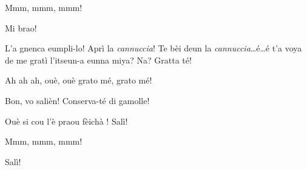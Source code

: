 \begin{drama}
\PersEmpourtantaspeaks Mmm, mmm, mmm! 

\Gerominespeaks Mi brao!

\Casimirspeaks L'a gnenca eumpli-lo! Aprì la \textit{cannuccia}! Te bèi deun la \textit{cannuccia}\ldots é\ldots é t'a voya de me gratì l'itseun-a eunna miya? Na? Gratta té!

\Gerominespeaks{} Ah ah ah, ouè, ouè grato mé, grato mé!

\Casimirspeaks Bon, vo salièn! Conserva-té di gamolle!

\Gerominespeaks Ouè si cou l'è praou fèichà \bendato! Salì!

\PersEmpourtantaspeaks{} Mmm, mmm, mmm! 

\Eunfeurmispeaks Salì!


\ridocliou

\DeriLeRido


\end{drama}